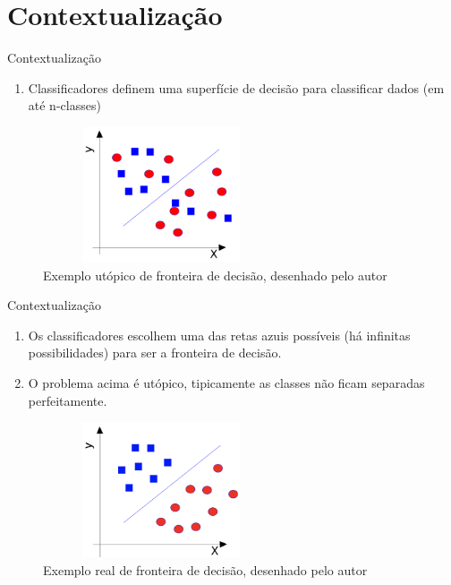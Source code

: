 \section{Contextualização}

\begin{frame}
	\begin{block}{Contextualização}
		\begin{enumerate}
			\item Classificadores definem uma superfície de decisão para classificar dados (em até n-classes)
		\end{enumerate}
		\begin{figure}[!htb]
			\centering	  				
			\includegraphics[height=4cm, width = 7cm]{./pic/fronteirautopia.png}
			\caption{Exemplo utópico de fronteira de decisão, desenhado pelo autor}
			\label{fig_ds_process}
		\end{figure}	
	\end{block}
\end{frame}

\begin{frame}
	\begin{block}{Contextualização}
		\begin{enumerate}
			\item Os classificadores escolhem uma das retas azuis possíveis (há infinitas possibilidades) para ser a fronteira de decisão.
			\item O problema acima é utópico, tipicamente as classes não ficam separadas perfeitamente.
		\end{enumerate}
			\begin{figure}[!htb]
			\centering	  				
			\includegraphics[height=4cm, width = 7cm]{./pic/fronteirareal.png}
			\caption{Exemplo real de fronteira de decisão, desenhado pelo autor}
			\label{fig_ds_process}
		\end{figure}	
	\end{block}
\end{frame}

